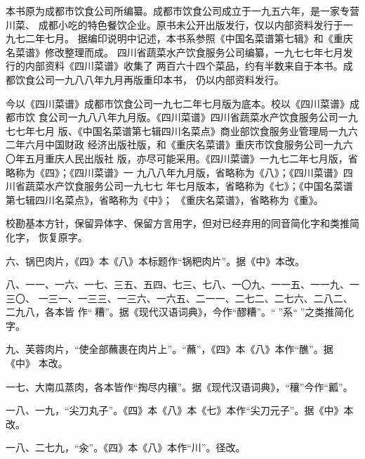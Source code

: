 \begin{list}{}{%
	\setlength{\topsep}{0pt}%
	\setlength{\leftmargin}{.527189mm}%
	\setlength{\rightmargin}{.527189mm}%
	\setlength{\listparindent}{\parindent}%
	\setlength{\itemindent}{\parindent}%
	\setlength{\parsep}{\parskip}%
	\addtolength{\textheight}{2.800042mm}%
}%
\item[]%
\vspace{0\baselineskip plus .5\baselineskip}%

本书原为成都市饮食公司所编纂。成都市饮食公司成立于一九五六年，是一家专营川菜、
成都小吃的特色餐饮企业。原书未公开出版发行，仅以内部资料发行于一九七二年七月。
据编印说明中记述，本书系参照《中国名菜谱第七辑》和《重庆名菜谱》修改整理而成。
四川省蔬菜水产饮食服务公司编纂，一九七七年七月发行的内部资料《四川菜谱》收集了
两百六十四个菜品，约有半数来自于本书。成都饮食公司一九八八年九月再版重印本书，
仍以内部资料发行。

今以《四川菜谱》成都市饮食公司一九七二年七月版为底本。校以《四川菜谱》成都市饮
食公司一九八八年九月版。《四川菜谱》四川省蔬菜水产饮食服务公司一九七七年七月
版、《中国名菜谱第七辑四川名菜点》商业部饮食服务业管理局一九六二年六月中国财政
经济出版社版，和《重庆名菜谱》重庆市饮食服务公司一九六〇年五月重庆人民出版社
版，亦尽可能采用。《四川菜谱》一九七二年七月版，省略称为《四》；《四川菜谱》一
九八八年九月版，省略称为《八》；《四川菜谱》四川省蔬菜水产饮食服务公司一九七七
年七月版本，省略称为《七》；《中国名菜谱第七辑四川名菜点》，省略称为《中》；
《重庆名菜谱》，省略称为《重》。

校勘基本方针，保留异体字、保留方言用字，但对已经弃用的同音简化字和类推简化字，
恢复原字。

\vspace{1\baselineskip}%

六、锅巴肉片，《四》本《八》本标题作“锅粑肉片”。据《中》本改。

八、一一、一六、一七、三五、五四、七三、七八、一〇九、一一五、一一九、一三〇、
一三一、一三三、一三六、一六五、二一一、二七二、二七六、二八二、二九八，各本皆
作“𰪿糟”。据《现代汉语词典》，今作“醪糟”。“𰪿”系“𫃑”之类推简化字。

九、芙蓉肉片，“使全部蘸裹在肉片上”。“蘸”，《四》本《八》本作“醮”。据《中》
本改。

一七、大南瓜蒸肉，各本皆作“掏尽内穰”。据《现代汉语词典》，“穰”今作“瓤”。

一八、一九，“尖刀丸子”。《四》本《八》本《七》本作“尖刀元子”。据《中》本改。

一八、二七九，“汆”。《四》本《八》本作“川”。径改。


\end{list}
